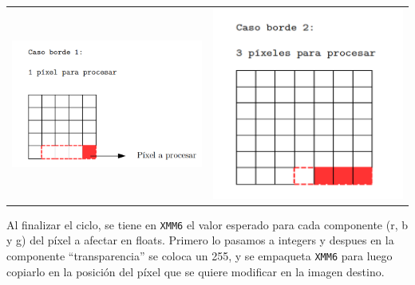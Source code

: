         {\centering \begin{tabular}{cc}
          \includegraphics[width=7cm]{./imagenes/7.png} &
          \includegraphics[width=7cm]{./imagenes/8.png}
          \\
        \end{tabular}}

        Al finalizar el ciclo, se tiene en \texttt{XMM6} el valor esperado para cada componente (r, b y g) del píxel a afectar en floats. Primero lo pasamos a integers y despues en la componente “transparencia” se coloca un 255, y se empaqueta \texttt{XMM6} para luego copiarlo en la posición del píxel que se quiere modificar en la imagen destino. 